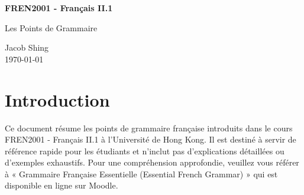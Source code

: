 \documentclass{article}
\begin{document}
\begin{center} 
    {\bfseries\LARGE FREN2001 - Français II.1
    \par\Large Les Points de Grammaire}
    
    \large Jacob Shing \\
    \today
\end{center}

\section*{Introduction}

Ce document résume les points de grammaire française introduits dans le cours FREN2001 - Français II.1
à l'Université de Hong Kong. Il est destiné à servir de référence rapide pour les étudiants
et n'inclut pas d'explications détaillées ou d'exemples exhaustifs. Pour une compréhension approfondie,
veuillez vous référer à « Grammaire Française Essentielle (Essential French Grammar) » qui est disponible
en ligne sur Moodle.

\tableofcontents

\newpage


\end{document}
